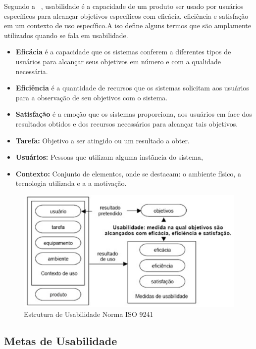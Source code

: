 	Segundo a ~, usabilidade é a capacidade de um produto ser usado por usuários específicos para alcançar objetivos específicos com eficácia, eficiência e satisfação em um contexto de uso específico.A iso define alguns termos que são amplamente utilizados quando se fala em usabilidade.

\begin{itemize}
\item \textbf{Eficácia} é a capacidade que os sistemas conferem a diferentes tipos de usuários para alcançar seus objetivos em número e com a qualidade necessária. 
\item \textbf{Eficiência} é a quantidade de recursos que os sistemas solicitam aos usuários para a observação de seu objetivos com o sistema.
\item \textbf{Satisfação} é a emoção que os sistemas proporciona, aos usuários em face dos resultados obtidos e dos recursos necessários para alcançar tais objetivos. 
\item \textbf{Tarefa:} Objetivo a ser atingido ou um resultado a obter.
\item \textbf{Usuários:} Pessoas que utilizam alguma instãncia do sistema,
\item \textbf{Contexto:} Conjunto de elementos, onde se destacam: o ambiente físico, a tecnologia utilizada e a a motivação.
\end{itemize}


\begin{figure}[h]
    \centering
    \includegraphics[keepaspectratio=true,scale=0.60]
      {figuras/estruturausabilidade9241.eps}
    \caption{Estrutura de Usabilidade Norma ISO 9241 ~\cite{cybis2010ergonomia}}
    \label{tdd_ciclo}
\end{figure}

\subsection{Metas de Usabilidade}

